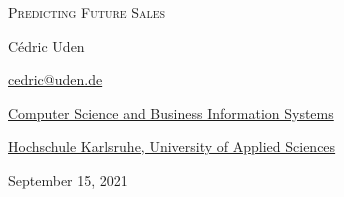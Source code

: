 \begin{center}
    
{\LARGE\textsc{Predicting Future Sales}}

\vspace*{10mm}

{\Large Cédric Uden}

\vspace*{2mm}

{\large\href{mailto:cedric@uden.de}{cedric@uden.de}}

\vspace*{6mm}

{\large\href{https://www.h-ka.de/en/about-hka/faculties/computer-science-and-business-information-systems/overview}{Computer Science and Business Information Systems}}

{\large\href{https://www.h-ka.de/en/}{Hochschule Karlsruhe, University of Applied Sciences}}

\vspace*{12mm}



\vspace*{12mm}

{\large September 15, 2021}

\vspace*{12mm}

\end{center}
